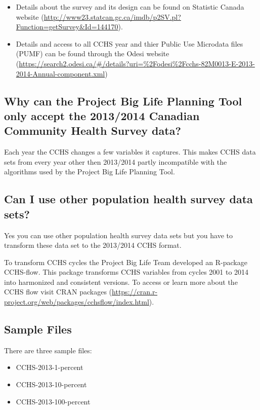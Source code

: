 \documentclass[]{book}
\providecommand{\tightlist}{%
  \setlength{\itemsep}{0pt}\setlength{\parskip}{0pt}}
\begin{document}
\begin{itemize}
\tightlist
\item
  Details about the survey and its design can be found on Statistic
  Canada website
  (\url{http://www23.statcan.gc.ca/imdb/p2SV.pl?Function=getSurvey\&Id=144170}).
\item
  Details and access to all CCHS year and thier Public Use Microdata
  files (PUMF) can be found through the Odesi website
  (\url{https://search2.odesi.ca/\#/details?uri=\%2Fodesi\%2Fcchs-82M0013-E-2013-2014-Annual-component.xml})
\end{itemize}

\subsection{Why can the Project Big Life Planning Tool only accept the
2013/2014 Canadian Community Health Survey
data?}\label{why-can-the-project-big-life-planning-tool-only-accept-the-20132014-canadian-community-health-survey-data}

Each year the CCHS changes a few variables it captures. This makes CCHS
data sets from every year other then 2013/2014 partly incompatible with
the algorithms used by the Project Big Life Planning Tool.

\subsection{Can I use other population health survey data
sets?}\label{can-i-use-other-population-health-survey-data-sets}

Yes you can use other population health survey data sets but you have to
transform these data set to the 2013/2014 CCHS format.

To transform CCHS cycles the Project Big Life Team developed an
R-package CCHS-flow. This package transforms CCHS variables from cycles
2001 to 2014 into harmonized and consistent versions. To access or learn
more about the CCHS flow visit CRAN packages
(\url{https://cran.r-project.org/web/packages/cchsflow/index.html}).

\subsection{Sample Files}\label{sample-files}

There are three sample files:

\begin{itemize}
\tightlist
\item
  CCHS-2013-1-percent
\item
  CCHS-2013-10-percent
\item
  CCHS-2013-100-percent
\end{itemize}
\end{document}
